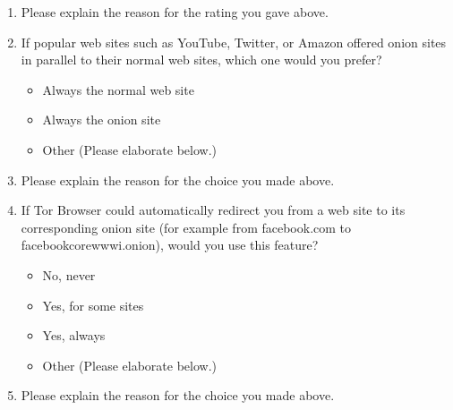 \begin{enumerate}
    \item Please explain the reason for the rating you gave above.

    \item If popular web sites such as YouTube, Twitter, or Amazon offered
        onion sites in parallel to their normal web sites, which one would you
        prefer?
        \begin{itemize}[label=$\Circle$]
            \item Always the normal web site
            \item Always the onion site
            \item Other (Please elaborate below.)
        \end{itemize}

    \item Please explain the reason for the choice you made above.

    \item If Tor Browser could automatically redirect you from a web site to
        its corresponding onion site (for example from facebook.com to
        facebookcorewwwi.onion), would you use this feature?
        \begin{itemize}[label=$\Circle$]
            \item No, never
            \item Yes, for some sites
            \item Yes, always
            \item Other (Please elaborate below.)
        \end{itemize}

    \item Please explain the reason for the choice you made above.


\end{enumerate}
